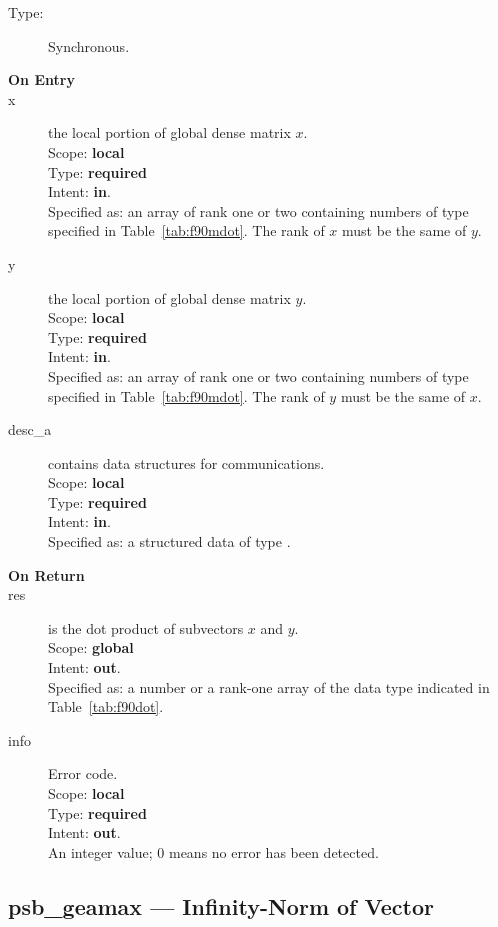 \begin{description}
\item[Type:] Synchronous.
\item[\bf On Entry]
\item[x] the local portion of global dense matrix
$x$. \\
Scope: {\bf local} \\
Type: {\bf required} \\
Intent: {\bf in}.\\
Specified as: an array of rank one or two
containing numbers of type specified in
Table~\ref{tab:f90mdot}. The rank of $x$ must be the same of $y$. 
\item[y] the local portion of global dense matrix
$y$. \\
Scope: {\bf local} \\
Type: {\bf required} \\
Intent: {\bf in}.\\
Specified as: an array of rank one or two
containing numbers of type specified in
Table~\ref{tab:f90mdot}. The rank of $y$ must be the same of $x$. 
\item[desc\_a] contains data structures for communications.\\
Scope: {\bf local} \\
Type: {\bf required}\\
Intent: {\bf in}.\\
Specified as: a structured data of type \descdata.
\item[\bf On Return] 
\item[res] is the dot product of subvectors $x$ and $y$.\\
Scope: {\bf global} \\
Intent: {\bf out}.\\
Specified as: a number or a rank-one array  of the data type indicated
in Table~\ref{tab:f90dot}. 
\item[info] Error code.\\
Scope: {\bf local} \\
Type: {\bf required} \\
Intent: {\bf out}.\\
An integer value; 0 means no error has been detected. 
\end{description}

%
%


\clearpage\subsection*{psb\_geamax --- Infinity-Norm of Vector}    


